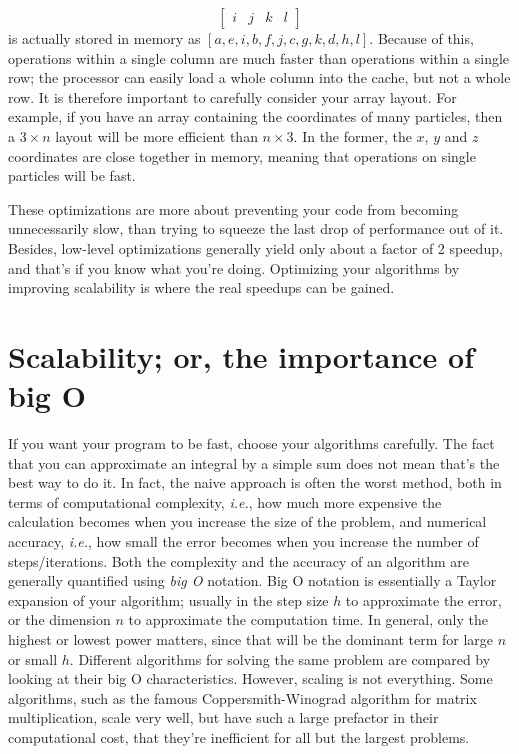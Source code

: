 \documentclass[openany,oneside]{report}
\begin{document}
\begin{itemize}
\begin{equation*}
\begin{bmatrix}
        i & j & k & l
    \end{bmatrix}
    \end{equation*}
    is actually stored in memory as $\left[a,e,i,b,f,j,c,g,k,d,h,l\right]$.
    Because of this, operations within a single column are much faster than operations within a single row; the processor can easily load a whole column into the cache, but not a whole row.
    It is therefore important to carefully consider your array layout.
    For example, if you have an array containing the coordinates of many particles, then a $3\times n$ layout will be more efficient than $n\times 3$.
    In the former, the $x$, $y$ and $z$ coordinates are close together in memory, meaning that operations on single particles will be fast.
\end{itemize}
These optimizations are more about preventing your code from becoming unnecessarily slow, than trying to squeeze the last drop of performance out of it.
Besides, low-level optimizations generally yield only about a factor of 2 speedup, and that's if you know what you're doing.
Optimizing your algorithms by improving scalability is where the real speedups can be gained.

\section{Scalability; or, the importance of big O}

If you want your program to be fast, choose your algorithms carefully.
The fact that you can approximate an integral by a simple sum does not mean that's the best way to do it.
In fact, the naive approach is often the worst method, both in terms of computational complexity, \emph{i.e.}, how much more expensive the calculation becomes when you increase the size of the problem, and numerical accuracy, \emph{i.e.}, how small the error becomes when you increase the number of steps/iterations.
Both the complexity and the accuracy of an algorithm are generally quantified using \emph{big O} notation.
Big O notation is essentially a Taylor expansion of your algorithm; usually in the step size $h$ to approximate the error, or the dimension $n$ to approximate the computation time.
In general, only the highest or lowest power matters, since that will be the dominant term for large $n$ or small $h$.
Different algorithms for solving the same problem are compared by looking at their big O characteristics.
However, scaling is not everything.
Some algorithms, such as the famous Coppersmith-Winograd algorithm for matrix multiplication, scale very well, but have such a large prefactor in their computational cost, that they're inefficient for all but the largest problems.
\end{document}
